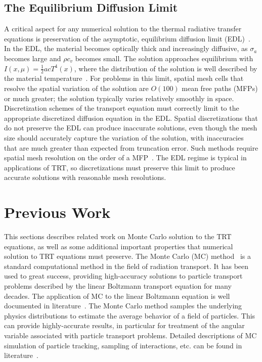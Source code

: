 \subsection{The Equilibrium Diffusion Limit}

A critical aspect for any numerical solution to the thermal radiative transfer equations
is preservation of the asymptotic, equilibrium diffusion limit (EDL)~\cite{morel_ldtrt,larsen_edl}.
In the EDL, the material becomes optically thick and increasingly diffusive, as $\sigma_a$ becomes large and
$\rho c_v$ becomes small.  The solution approaches equilibrium with
$I(x,\mu)=\frac{1}{2}acT^4(x)$,
where the distribution of the solution is well described by the material
temperature~\cite{larsen_edl}.  For problems in this limit, spatial mesh cells that resolve the spatial variation of the solution are
$O(100)$ mean free paths (MFPs) or much greater; the solution typically varies relatively smoothly in space.
Discretization schemes of the transport equation must correctly limit to the appropriate
discretized diffusion equation in the EDL.  Spatial discretizations that do not preserve
the EDL can produce inaccurate solutions, even though the mesh size should accurately capture the variation of the solution, with
inaccuracies that are much greater than expected from truncation error.  Such methods
require spatial mesh resolution on the order of a MFP~\cite{morel_ldtrt}.  The EDL regime is typical in
applications of TRT, so discretizations must preserve this limit to produce accurate
solutions with reasonable mesh resolutions.

\section{Previous Work}

This sections describes related work on Monte Carlo solution to the TRT equations, as well
as some additional important properties that numerical solution to TRT equations must preserve.  
The Monte Carlo (MC) method~\cite{shultis_mc} is a standard computational method in
the field of radiation transport.  It has been used to great success, providing high-accuracy
solutions to particle
transport problems described by the linear Boltzmann transport equation for many decades.  The application of MC to the linear Boltzmann
equation is well documented in
literature~\cite{mcnp,shultis_mc,lewis}.  The Monte Carlo method samples the underlying physics distributions to estimate the
average behavior of a field of particles.  This can provide highly-accurate results, in
particular for treatment of the angular variable associated with particle transport
problems.  Detailed descriptions of MC simulation of particle tracking, sampling of
interactions, etc. can be found in literature~\cite{mcnp,wollaber_review,shultis_mc}.

